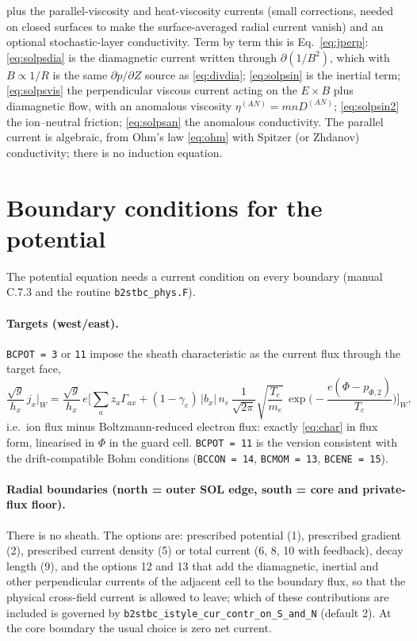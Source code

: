 \documentclass[11pt,a4paper]{article}
\newcommand{\Te}{T_e}
\newcommand{\code}[1]{\texttt{#1}}
\begin{document}
plus the parallel-viscosity and heat-viscosity currents (small corrections, needed on closed surfaces to make the
surface-averaged radial current vanish) and an optional stochastic-layer conductivity. Term by term this is
Eq.~\eqref{eq:jperp}: \eqref{eq:solpsdia} is the diamagnetic current written through $\partial(1/B^2)$, which with
$B\propto1/R$ is the same $\partial p/\partial Z$ source as \eqref{eq:divdia}; \eqref{eq:solpsin} is the inertial term;
\eqref{eq:solpsvis} the perpendicular viscous current acting on the $E\times B$ plus diamagnetic flow, with an anomalous
viscosity $\eta^{(AN)} = m n D^{(AN)}$; \eqref{eq:solpsin2} the ion--neutral friction; \eqref{eq:solpsan} the anomalous
conductivity. The parallel current is algebraic, from Ohm's law \eqref{eq:ohm} with Spitzer (or Zhdanov) conductivity;
there is no induction equation.

\section{Boundary conditions for the potential}

The potential equation needs a current condition on every boundary (manual C.7.3 and the routine \code{b2stbc\_phys.F}).

\paragraph{Targets (west/east).} \code{BCPOT = 3} or \code{11} impose the sheath characteristic as the current flux
through the target face,
\begin{equation}
  \frac{\sqrt g}{h_x}\,j_x\Big|_{W} = \frac{\sqrt g}{h_x}\,e\Big[\sum_a z_a\Gamma_{ax}
  + (1-\gamma_e)\,|b_x|\,n_e\,\frac{1}{\sqrt{2\pi}}\sqrt{\frac{\Te}{m_e}}\,
  \exp\!\Big(-\frac{e(\Phi - p_{\Phi,2})}{\Te}\Big)\Big]_W ,
  \label{eq:bcpot}
\end{equation}
i.e.\ ion flux minus Boltzmann-reduced electron flux: exactly \eqref{eq:char} in flux form, linearised in $\Phi$ in the
guard cell. \code{BCPOT = 11} is the version consistent with the drift-compatible Bohm conditions
(\code{BCCON = 14}, \code{BCMOM = 13}, \code{BCENE = 15}).

\paragraph{Radial boundaries (north = outer SOL edge, south = core and private-flux floor).} There is no sheath. The
options are: prescribed potential (1), prescribed gradient (2), prescribed current density (5) or total current
(6, 8, 10 with feedback), decay length (9), and the options 12 and 13 that add the diamagnetic, inertial and other
perpendicular currents of the adjacent cell to the boundary flux, so that the physical cross-field current is allowed
to leave; which of these contributions are included is governed by \code{b2stbc\_istyle\_cur\_contr\_on\_S\_and\_N}
(default 2). At the core boundary the usual choice is zero net current.
\end{document}
